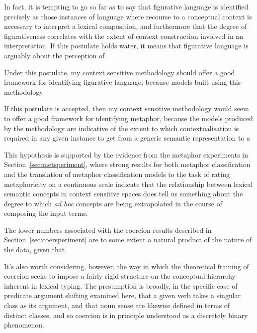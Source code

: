 In fact, it is tempting to go so far as to say that figurative language is identified precisely as those instances of language where recourse to a conceptual context is necessary to interpret a lexical composition, and furthermore that the degree of figurativeness correlates with the extent of context construction involved in an interpretation.  If this postulate holds water, it means that figurative language is arguably about the perception of 

Under this postulate, my context sensitive methodology should offer a good framework for identifying figurative language, because models built using this methodology 

If this postulate is accepted, then my context sensitive methodology would seem to offer a good framework for identifying metaphor, because the models produced by the methodology are indicative of the extent to which contextualisation is required in any given instance to get from a generic semantic representation to a 


This hypothesis is supported by the evidence from the metaphor experiments in Section~\ref{sec:metsperiment}, where strong results for both metaphor classification and the translation of metaphor classification models to the task of rating metaphoricity on a continuous scale indicate that the relationship between lexical semantic concepts in context sensitive spaces does tell us something about the degree to which \emph{ad hoc} concepts are being extrapolated in the course of composing the input terms.

The lower numbers associated with the coercion results described in Section~\ref{sec:coersperiment} are to some extent a natural product of the nature of the data, given that 

It's also worth considering, however, the way in which the theoretical framing of coercion seeks to impose a fairly rigid structure on the conceptual hierarchy inherent in lexical typing.  The presumption is broadly, in the specific case of predicate argument shifting examined here, that a given verb takes a singular class as its argument, and that noun sense are likewise defined in terms of distinct classes, and so coercion is in principle understood as a discretely binary phenomenon.


